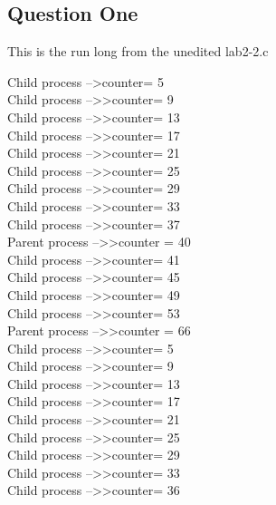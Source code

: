 \documentclass[12pt, titlepage]{article}
\begin{document}
\subsection*{Question One}
\par{}
This is the run long from the unedited lab2-2.c
\begin{center}
Child process --\textgreater\textgreate counter= 5\\
Child process --\textgreater\textgreater counter= 9\\
Child process --\textgreater\textgreater counter= 13\\
Child process --\textgreater\textgreater counter= 17\\
Child process --\textgreater\textgreater counter= 21\\
Child process --\textgreater\textgreater counter= 25\\
Child process --\textgreater\textgreater counter= 29\\
Child process --\textgreater\textgreater counter= 33\\
Child process --\textgreater\textgreater counter= 37\\
Parent process --\textgreater\textgreater counter = 40\\
Child process --\textgreater\textgreater counter= 41\\
Child process --\textgreater\textgreater counter= 45\\
Child process --\textgreater\textgreater counter= 49\\
Child process --\textgreater\textgreater counter= 53\\
Parent process --\textgreater\textgreater counter = 66\\
Child process --\textgreater\textgreater counter= 5\\
Child process --\textgreater\textgreater counter= 9\\
Child process --\textgreater\textgreater counter= 13\\
Child process --\textgreater\textgreater counter= 17\\
Child process --\textgreater\textgreater counter= 21\\
Child process --\textgreater\textgreater counter= 25\\
Child process --\textgreater\textgreater counter= 29\\
Child process --\textgreater\textgreater counter= 33\\
Child process --\textgreater\textgreater counter= 36\\

\end{center}
\end{document}

